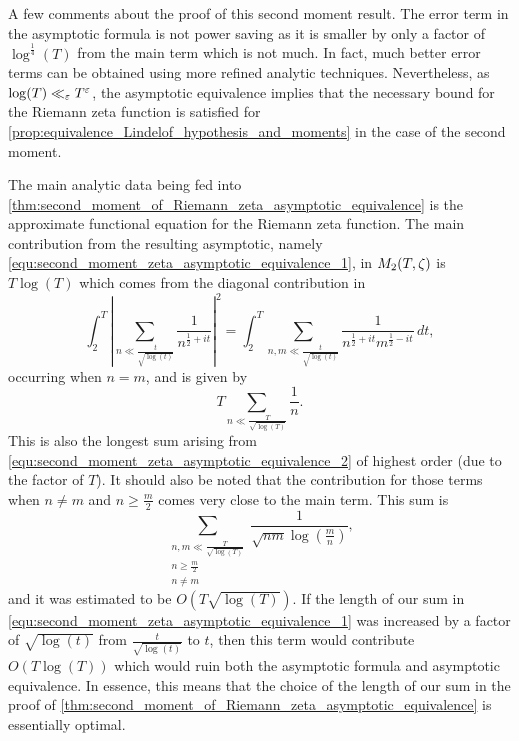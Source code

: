     A few comments about the proof of this second moment result. The error term in the asymptotic formula is not power saving as it is smaller by only a factor of \(\log^{\frac{1}{4}}(T)\) from the main term which is not much. In fact, much better error terms can be obtained using more refined analytic techniques. Nevertheless, as \(\log(T) \ll_{\varepsilon} T^{\varepsilon}\), the asymptotic equivalence implies that the necessary bound for the Riemann zeta function is satisfied for \cref{prop:equivalence_Lindelof_hypothesis_and_moments} in the case of the second moment.

    The main analytic data being fed into \cref{thm:second_moment_of_Riemann_zeta_asymptotic_equivalence} is the approximate functional equation for the Riemann zeta function. The main contribution from the resulting asymptotic, namely \cref{equ:second_moment_zeta_asymptotic_equivalence_1}, in \(M_{2}(T,\zeta)\) is \(T\log(T)\) which comes from the diagonal contribution in
    \[
      \int_{2}^{T}\left|\sum_{n \ll \frac{t}{\sqrt{\log(t)}}}\frac{1}{n^{\frac{1}{2}+it}}\right|^{2} = \int_{2}^{T}\sum_{n,m \ll \frac{t}{\sqrt{\log(t)}}}\frac{1}{n^{\frac{1}{2}+it}m^{\frac{1}{2}-it}}\,dt,
    \]
    occurring when \(n = m\), and is given by
    \[
      T\sum_{n \ll \frac{T}{\sqrt{\log(T)}}}\frac{1}{n}.
    \]
    This is also the longest sum arising from \cref{equ:second_moment_zeta_asymptotic_equivalence_2} of highest order (due to the factor of \(T\)). It should also be noted that the contribution for those terms when \(n \neq m\) and \(n \ge \frac{m}{2}\) comes very close to the main term. This sum is
    \[
      \sum_{\substack{n,m \ll \frac{T}{\sqrt{\log(T)}} \\ n \ge \frac{m}{2} \\ n \neq m}}\frac{1}{\sqrt{nm}\log\left(\frac{m}{n}\right)},
    \]
    and it was estimated to be \(O\left(T\sqrt{\log(T)}\right)\). If the length of our sum in \cref{equ:second_moment_zeta_asymptotic_equivalence_1} was increased by a factor of \(\sqrt{\log(t)}\) from \(\frac{t}{\sqrt{\log(t)}}\) to \(t\), then this term would contribute \(O\left(T\log(T)\right)\) which would ruin both the asymptotic formula and asymptotic equivalence. In essence, this means that the choice of the length of our sum in the proof of \cref{thm:second_moment_of_Riemann_zeta_asymptotic_equivalence} is essentially optimal.